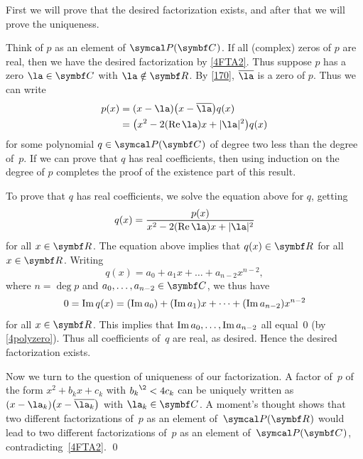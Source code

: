\proof
First we will prove that the desired factorization exists, and after that we will prove the uniqueness.

Think of $p$ as an element of $\P(\C{})$. If all (complex) zeros of $p$ are real, then we have the desired factorization by \ref{4FTA2}. Thus suppose $p$ has a zero $\la \in \C{}$ with $\la \notin \R{}$. By \ref{170}, $\bar{\la}$ is a zero of $p$. Thus we can write
\begin{align*}
p(x) &= (x - \la)\paren[\big]{x - \bar{\la}}q(x) \\
&= \bigl(x^2 - 2(\re \la)x + |\la|^2\bigr) q(x)
\end{align*}
for some polynomial $q \in \P(\C{})$ of degree two less than the degree of~$p$.  If we can prove that $q$ has real coefficients, then using induction on the degree of $p$ completes the proof of the existence part of this result.

To prove that $q$ has real coefficients, we solve the equation above for $q$,
getting
\[
q(x) = \frac{p(x)}{x^2 - 2(\re \la)x + |\la|^2}
\]
for all $x \in \R{}$.  The equation above implies that $q(x) \in \R{}$ for all $x \in \R{}$.
Writing
\[
q(x) = a_0 + a_1 x + \dots + a_{n-2} x^{n-2}\!,
\]
where $n = \deg p$ and $a_0, \dots, a_{n-2} \in \C{}$, we thus have
\[
0 = \operatorname{Im} q(x) = (\operatorname{Im} a_0) + (\operatorname{Im} a_1) x + \dots + (\operatorname{Im} a_{n-2}) x^{n-2}
\]
for all $x \in \R{}$.  This implies that $\operatorname{Im} a_0, \dots, \operatorname{Im} a_{n-2}$ all equal~$0$ (by
\ref{4polyzero}).  Thus all coefficients of~$q$ are real, as desired. Hence the
desired factorization exists.

Now we turn to the question of uniqueness of our factorization.  A factor of~$p$ of
the form $x^2 + b_k x + c_k$ with ${b_k}^{\2} < 4 c_k$ can be uniquely written
as $(x - \la_k)\paren[\big]{x - \overline{\la_k}}$ with $\la_k \in \C{}$.  A moment's thought shows that two
different factorizations of~$p$ as an element of~$\P(\R{})$ would lead to two
different factorizations of~$p$ as an element of~$\P(\C{})$,
contradicting~\ref{4FTA2}.
\qed

